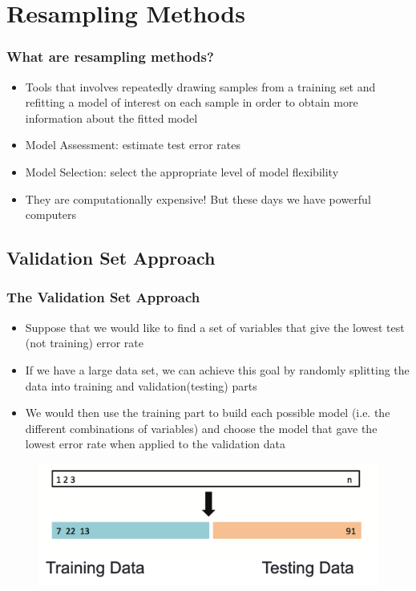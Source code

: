 \documentclass[
  shownotes,
  xcolor={svgnames},
  hyperref={colorlinks,citecolor=DarkBlue,linkcolor=DarkRed,urlcolor=DarkBlue}
  ]{beamer}
\begin{document}
\section{Resampling Methods}
\begin{frame}[fragile]
\frametitle{What are resampling methods?}

\begin{itemize}
\item Tools that involves repeatedly drawing samples from a training set and refitting a model of interest on each sample in order to obtain more information about the fitted model
\medskip
\item Model Assessment: estimate test error rates 
\medskip
\item Model Selection: select the appropriate level of model flexibility
\medskip
\item They are computationally expensive! But these days we have powerful computers

\end{itemize}




\end{frame}
\subsection{Validation Set Approach}
\begin{frame}[fragile]
\frametitle{The Validation Set Approach}

\begin{itemize}
\item Suppose that we would like to find a set of variables that give the lowest test (not training) error rate
\item If we have a large data set, we can achieve this goal by randomly splitting the data into training and validation(testing) parts
\item We would then use the training part to build each possible model (i.e. the different combinations of variables) and choose the model that gave the lowest error rate when applied to the validation data
\end{itemize}

       \begin{figure}[H] \centering
            \captionsetup{justification=centering}
              \includegraphics[scale=0.4]{figures/fig51.png}
       \end{figure}

\end{frame}
\end{document}

